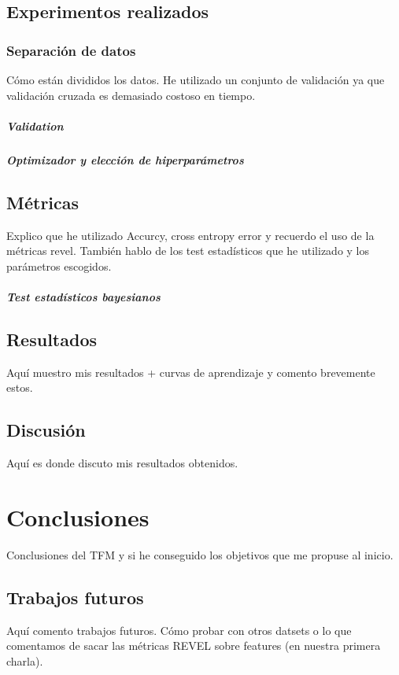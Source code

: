 \section{Experimentos realizados}

\subsection{Separación de datos}

Cómo están divididos los datos. He utilizado un conjunto de validación ya que validación cruzada es demasiado costoso en tiempo.

\paragraph*{Validation}

\paragraph*{Optimizador y elección de hiperparámetros}



\section{Métricas}
Explico que he utilizado Accurcy, cross entropy error y recuerdo el uso de la métricas revel. También hablo de los test estadísticos que he utilizado y los parámetros escogidos.
\paragraph*{Test estadísticos bayesianos}


\section{Resultados}

Aquí muestro mis resultados + curvas de aprendizaje y comento brevemente estos.

\section{Discusión} \label{sec:discusion}
Aquí es donde discuto mis resultados obtenidos.


\clearpage
\chapter{Conclusiones} \label{cap:conc}
Conclusiones del TFM y si he conseguido los objetivos que me propuse al inicio.

\section{Trabajos futuros}

Aquí comento trabajos futuros. Cómo probar con otros datsets o lo que comentamos de sacar las métricas REVEL sobre features (en nuestra primera charla).


